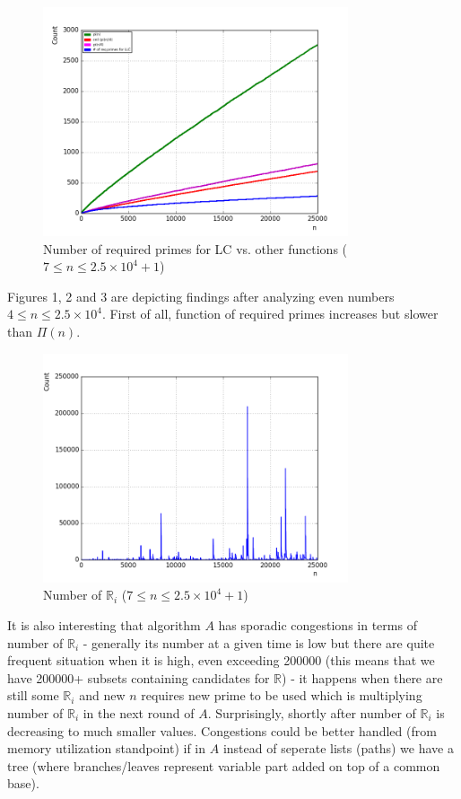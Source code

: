 \documentclass[10pt,twocolumn]{article}
\begin{document}
\begin{figure}[!ht]
\centering
\captionsetup{justification=centering}
\includegraphics[width=9cm]{f_required_primes}
\caption[caption]{Number of required primes for LC vs. other functions ($7 \leq n \leq 2.5 \times 10^4 +1$)}
\label{fig:requiredprimes}
\end{figure}	

Figures 1, 2 and 3 are depicting findings after analyzing even numbers $4 \leq n \leq 2.5 \times 10^4$. First of all, function of required primes increases but slower than $\Pi(n)$.

\begin{figure}[!ht]
\centering
\captionsetup{justification=centering}
\includegraphics[width=9cm]{f_number_of_possible_sets}
\caption[caption]{Number of $\mathbb{R}_i$ ($7 \leq n \leq 2.5 \times 10^4 + 1$)}
\label{fig:numberofsets}
\end{figure}

It is also interesting that algorithm $A$ has sporadic congestions in terms of number of $\mathbb{R}_i$ - generally its number at a given time is low but there are quite frequent situation when it is high, even exceeding 200000 (this means that we have 200000+ subsets containing candidates for $\mathbb{R}$) - it happens when there are still some $\mathbb{R}_i$ and new $n$ requires new prime to be used which is multiplying number of $\mathbb{R}_i$ in the next round of $A$. Surprisingly, shortly after number of $\mathbb{R}_i$ is decreasing to much smaller values. Congestions could be better handled (from memory utilization standpoint) if in $A$ instead of seperate lists (paths) we have a tree (where branches/leaves represent variable part added on top of a common base).
\end{document}
